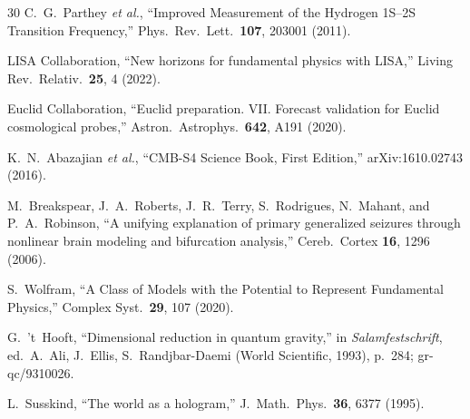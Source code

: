 \documentclass[aps,prd,twocolumn,superscriptaddress,longbibliography,nofootinbib]{revtex4-2}
\begin{document}
\begin{thebibliography}{30}
C.~G.~Parthey \textit{et al.},
``Improved Measurement of the Hydrogen 1S--2S Transition Frequency,''
Phys.\ Rev.\ Lett.\ \textbf{107}, 203001 (2011).

LISA Collaboration,
``New horizons for fundamental physics with LISA,''
Living Rev.\ Relativ.\ \textbf{25}, 4 (2022).

Euclid Collaboration,
``Euclid preparation. VII. Forecast validation for Euclid
cosmological probes,''
Astron.\ Astrophys.\ \textbf{642}, A191 (2020).

K.~N.~Abazajian \textit{et al.},
``CMB-S4 Science Book, First Edition,''
arXiv:1610.02743 (2016).

M.~Breakspear, J.~A.~Roberts, J.~R.~Terry, S.~Rodrigues,
N.~Mahant, and P.~A.~Robinson,
``A unifying explanation of primary generalized seizures through
nonlinear brain modeling and bifurcation analysis,''
Cereb.\ Cortex \textbf{16}, 1296 (2006).

S.~Wolfram,
``A Class of Models with the Potential to Represent Fundamental
Physics,''
Complex Syst.\ \textbf{29}, 107 (2020).

G.~'t~Hooft,
``Dimensional reduction in quantum gravity,''
in \textit{Salamfestschrift}, ed.\ A.~Ali, J.~Ellis,
S.~Randjbar-Daemi (World Scientific, 1993), p.~284;
gr-qc/9310026.

L.~Susskind,
``The world as a hologram,''
J.\ Math.\ Phys.\ \textbf{36}, 6377 (1995).

\end{thebibliography}
\end{document}
